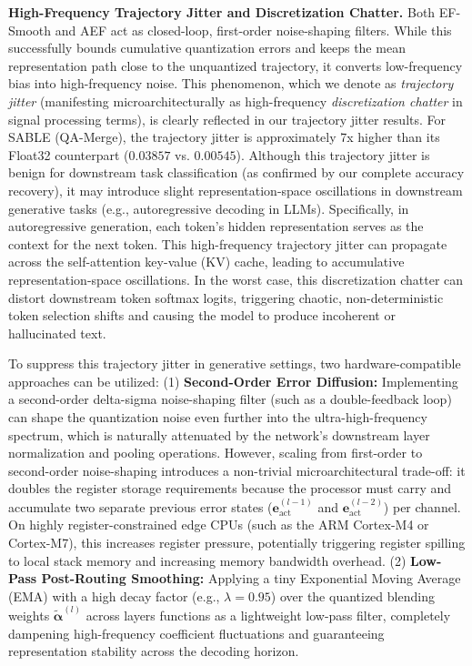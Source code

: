 \documentclass{article}
\theoremstyle{plain}
\theoremstyle{definition}
\theoremstyle{remark}
\begin{document}
\textbf{High-Frequency Trajectory Jitter and Discretization Chatter.} Both EF-Smooth and AEF act as closed-loop, first-order noise-shaping filters. While this successfully bounds cumulative quantization errors and keeps the mean representation path close to the unquantized trajectory, it converts low-frequency bias into high-frequency noise. This phenomenon, which we denote as \emph{trajectory jitter} (manifesting microarchitecturally as high-frequency \emph{discretization chatter} in signal processing terms), is clearly reflected in our trajectory jitter results. For SABLE (QA-Merge), the trajectory jitter is approximately 7x higher than its Float32 counterpart ($0.03857$ vs. $0.00545$). 
Although this trajectory jitter is benign for downstream task classification (as confirmed by our complete accuracy recovery), it may introduce slight representation-space oscillations in downstream generative tasks (e.g., autoregressive decoding in LLMs). Specifically, in autoregressive generation, each token's hidden representation serves as the context for the next token. This high-frequency trajectory jitter can propagate across the self-attention key-value (KV) cache, leading to accumulative representation-space oscillations. In the worst case, this discretization chatter can distort downstream token softmax logits, triggering chaotic, non-deterministic token selection shifts and causing the model to produce incoherent or hallucinated text. 

To suppress this trajectory jitter in generative settings, two hardware-compatible approaches can be utilized: (1) \textbf{Second-Order Error Diffusion:} Implementing a second-order delta-sigma noise-shaping filter (such as a double-feedback loop) can shape the quantization noise even further into the ultra-high-frequency spectrum, which is naturally attenuated by the network's downstream layer normalization and pooling operations. However, scaling from first-order to second-order noise-shaping introduces a non-trivial microarchitectural trade-off: it doubles the register storage requirements because the processor must carry and accumulate two separate previous error states ($\mathbf{e}_{\text{act}}^{(l-1)}$ and $\mathbf{e}_{\text{act}}^{(l-2)}$) per channel. On highly register-constrained edge CPUs (such as the ARM Cortex-M4 or Cortex-M7), this increases register pressure, potentially triggering register spilling to local stack memory and increasing memory bandwidth overhead. (2) \textbf{Low-Pass Post-Routing Smoothing:} Applying a tiny Exponential Moving Average (EMA) with a high decay factor (e.g., $\lambda = 0.95$) over the quantized blending weights $\tilde{\boldsymbol{\alpha}}^{(l)}$ across layers functions as a lightweight low-pass filter, completely dampening high-frequency coefficient fluctuations and guaranteeing representation stability across the decoding horizon.
\end{document}
